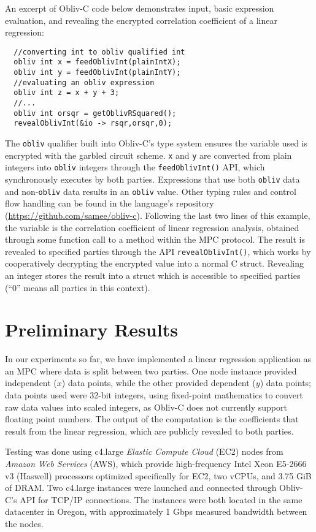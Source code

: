 \documentclass[conference]{IEEEtran}
\begin{document}
An excerpt of Obliv-C code below demonstrates input, basic expression evaluation, 
and revealing the encrypted correlation
coefficient of a linear regression:
\begin{verbatim}
  //converting int to obliv qualified int
  obliv int x = feedOblivInt(plainIntX);
  obliv int y = feedOblivInt(plainIntY);
  //evaluating an obliv expression
  obliv int z = x + y + 3;
  //...
  obliv int orsqr = getOblivRSquared();
  revealOblivInt(&io -> rsqr,orsqr,0);
\end{verbatim}
\noindent
The {\tt obliv} qualifier built into Obliv-C’s type system ensures
the variable used is encrypted with the garbled circuit 
scheme\cite{cryptoeprint:2015:1153}. {\tt x} and {\tt y} are converted 
from plain integers into {\tt obliv}
integers through the {\tt feedOblivInt()} API, which synchronously executes 
by both parties. Expressions that use both {\tt obliv} data and 
non-{\tt obliv} data results in an {\tt obliv} value.
Other typing rules and control flow handling can be found in
the language's repository (\url{https://github.com/samee/obliv-c}).
Following the last two lines of this example, the variable is the
correlation coefficient of linear regression analysis, obtained through
some function call to a method within the MPC protocol. The result is
revealed to specified parties through the API {\tt revealOblivInt()},
which works by cooperatively decrypting the encrypted value into a
normal C struct.  Revealing an integer stores the result into a struct
which is accessible to specified parties (``0'' means all parties in this
context).

\section{Preliminary Results}

In our experiments so far, we have implemented a linear regression
application as an MPC where data is split between two parties.  One node
instance provided independent ($x$) data points, while the other
provided dependent ($y$) data points; data points used were 32-bit
integers, using fixed-point mathematics to convert raw data values into
scaled integers, as Obliv-C does not currently support floating point
numbers.  The output of the computation is the coefficients that result
from the linear regression, which are publicly revealed to both parties.

Testing was done using c4.large \emph{Elastic Compute Cloud} (EC2) nodes
from \emph{Amazon Web Services} (AWS)\cite{aws:ec2}, which provide
high-frequency Intel Xeon E5-2666 v3 (Haswell) processors optimized
specifically for EC2, two vCPUs, and 3.75 GiB of DRAM.  Two c4.large
instances were launched and connected through Obliv-C's API for TCP/IP
connections. The instances were both located in the same datacenter in
Oregon, with approximately 1 Gbps measured bandwidth between the
nodes. 
\end{document}
